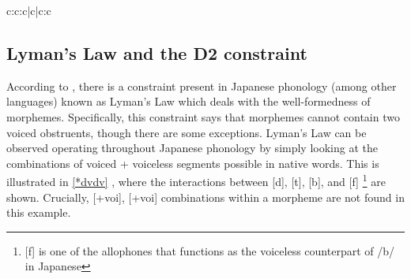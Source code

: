 \documentclass{article}
\begin{document}
    
\vspace{.25cm}
\begin{exe}
\ex
\label{t3}
\begin{tableau}{c:c:c|c|c:c}
                                                 
               \vio{}            \vio{}                          \vio{*!}                   \vio{}                      \vio{}                \vio{}          
               \vio{}            \vio{}                       \vio{*!}                   \vio{}                         \vio{}              \vio{*} 
              \vio{}            \vio{}                         \vio{}                    \vio{*!}                        \vio{*}           \vio{**} 
     \vio{}            \vio{}                          \vio{}                   \vio{}                       \vio{*}             \vio{*} 
                   \vio{*!}           \vio{}                          \vio{}                  \vio{}                            \vio{}            \vio{} 
\end{tableau}
\end{exe}
\vspace{.5cm}



\subsection{Lyman's Law and the D2 constraint}
\label{lyman}

According to \cite{Rice2006}, there is a constraint present in Japanese phonology (among other languages) known as Lyman's Law which deals with the well-formedness of morphemes. Specifically, this constraint says that morphemes cannot contain two voiced obstruents, though there are some exceptions. Lyman's Law can be observed operating throughout Japanese phonology by simply looking at the combinations of voiced + voiceless segments possible in native words. This is illustrated in \ref{*dvdv} \citep[p. 14]{Rice2006}, where the interactions between [d], [t], [b], and [f] \footnote{[f] is one of the allophones that functions as the voiceless counterpart of /b/ in Japanese} are shown. Crucially, [+voi], [+voi] combinations within a morpheme are not found in this example. 
\end{document}
